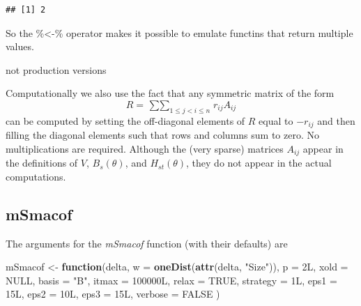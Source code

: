 \documentclass[
  12pt,
]{article}
\newenvironment{Shaded}{\begin{snugshade}}{\end{snugshade}}
\newcommand{\AttributeTok}[1]{\textcolor[rgb]{0.13,0.29,0.53}{#1}}
\newcommand{\ConstantTok}[1]{\textcolor[rgb]{0.56,0.35,0.01}{#1}}
\newcommand{\ControlFlowTok}[1]{\textcolor[rgb]{0.13,0.29,0.53}{\textbf{#1}}}
\newcommand{\DataTypeTok}[1]{\textcolor[rgb]{0.13,0.29,0.53}{#1}}
\newcommand{\DecValTok}[1]{\textcolor[rgb]{0.00,0.00,0.81}{#1}}
\newcommand{\FunctionTok}[1]{\textcolor[rgb]{0.13,0.29,0.53}{\textbf{#1}}}
\newcommand{\NormalTok}[1]{#1}
\newcommand{\OtherTok}[1]{\textcolor[rgb]{0.56,0.35,0.01}{#1}}
\newcommand{\StringTok}[1]{\textcolor[rgb]{0.31,0.60,0.02}{#1}}
\newcommand{\jis}{\mathop{\sum\sum}_{1\leq j<i\leq n}}
\begin{document}
\begin{verbatim}
## [1] 2
\end{verbatim}

So the \%\textless-\% operator makes it possible to emulate functins that return multiple values.

not production versions

Computationally we also use the fact that any symmetric matrix of the form
\begin{equation}
R=\jis r_{ij}A_{ij}
\label{eq:dcmat}
\end{equation}
can be computed by setting the off-diagonal elements of \(R\) equal to \(-r_{ij}\) and then filling the diagonal elements such that rows and columns sum to zero. No multiplications are required. Although the (very sparse) matrices \(A_{ij}\) appear in the definitions of \(V\), \(B_s(\theta)\), and \(H_{st}(\theta)\), they do not appear in the actual computations.

\subsection{mSmacof}\label{msmacof}

The arguments for the \emph{mSmacof} function (with their defaults) are

\begin{Shaded}
\begin{Highlighting}[]
\NormalTok{mSmacof }\OtherTok{\textless{}{-}} \ControlFlowTok{function}\NormalTok{(delta,}
                    \AttributeTok{w =} \FunctionTok{oneDist}\NormalTok{(}\FunctionTok{attr}\NormalTok{(delta, }\StringTok{"Size"}\NormalTok{)),}
                    \AttributeTok{p =} \DecValTok{2}\DataTypeTok{L}\NormalTok{,}
                    \AttributeTok{xold =} \ConstantTok{NULL}\NormalTok{,}
                    \AttributeTok{basis =} \StringTok{"B"}\NormalTok{,}
                    \AttributeTok{itmax =} \DecValTok{100000}\DataTypeTok{L}\NormalTok{,}
                    \AttributeTok{relax =} \ConstantTok{TRUE}\NormalTok{,}
                    \AttributeTok{strategy =} \DecValTok{1}\DataTypeTok{L}\NormalTok{,}
                    \AttributeTok{eps1 =} \DecValTok{15}\DataTypeTok{L}\NormalTok{,}
                    \AttributeTok{eps2 =} \DecValTok{10}\DataTypeTok{L}\NormalTok{,}
                    \AttributeTok{eps3 =} \DecValTok{15}\DataTypeTok{L}\NormalTok{,}
                    \AttributeTok{verbose =} \ConstantTok{FALSE}
\NormalTok{)}
\end{Highlighting}
\end{Shaded}
\end{document}
